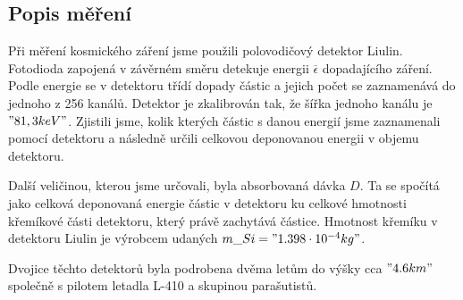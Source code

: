 \documentclass[12pt,a4paper]{article}
\begin{document}
\subsection*{Popis měření}
Při měření kosmického záření jsme použili polovodičový detektor Liulin. Fotodioda zapojená v závěrném směru
detekuje energii $ \overline{\epsilon} $ dopadajícího záření. Podle energie se v detektoru třídí dopady
částic a jejich počet se zaznamenává do jednoho z 256 kanálů. Detektor je zkalibrován tak, že šířka jednoho
kanálu je $"81,3 keV"$. Zjistili jsme, kolik kterých částic s danou energií jsme zaznamenali pomocí detektoru a
následně určili celkovou deponovanou energii v objemu detektoru.\par
Další veličinou, kterou jsme určovali, byla absorbovaná dávka $D$. Ta se spočítá jako celková deponovaná
energie částic v detektoru ku celkové hmotnosti křemíkové části detektoru, který právě zachytává částice.
Hmotnost křemíku v detektoru Liulin je výrobcem udaných $m\_{Si}="1.398\cdot 10^{-4} kg"$.\par
Dvojice těchto detektorů byla podrobena dvěma letům do výšky cca $"4.6 km"$ společně s pilotem letadla
L-410 a skupinou parašutistů.
\end{document}
